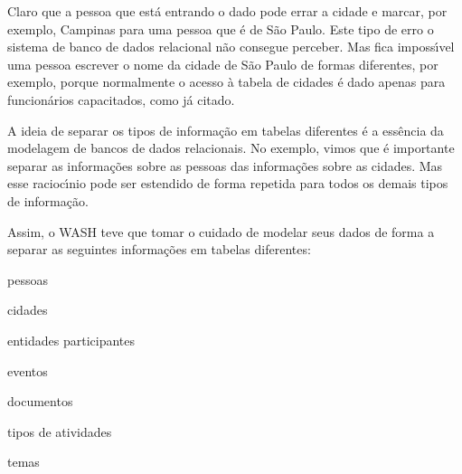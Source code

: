 \documentclass[
12pt,		%
openright,	%
twoside,  %
a4paper,			%
chapter=TITLE,		%
english,			%
french,				%
spanish,			%
brazil				%
]{USPSC-classe/USPSC}
\begin{document}
Claro que a pessoa que est\'a entrando o dado pode errar a cidade e marcar, por exemplo, Campinas para uma pessoa que \'e de S\~ao Paulo. Este tipo de erro o sistema de banco de dados relacional n\~ao consegue perceber. Mas fica imposs\'{\i}vel uma pessoa escrever o nome da cidade de S\~ao Paulo de formas diferentes, por exemplo, porque normalmente o acesso \`a tabela de cidades \'e dado apenas para funcion\'arios capacitados, como j\'a citado.

















A ideia de separar os tipos de informa\c{c}\~ao em tabelas diferentes \'e a ess\^encia da modelagem de bancos de dados relacionais. No exemplo, vimos que \'e importante separar as informa\c{c}\~oes sobre as pessoas das informa\c{c}\~oes sobre as cidades. Mas esse racioc\'{\i}nio pode ser estendido de forma repetida para todos os demais tipos de informa\c{c}\~ao.

















Assim, o WASH teve que tomar o cuidado de modelar seus dados de forma a separar as seguintes informa\c{c}\~oes em tabelas diferentes:


















\begin{alineas}
\item pessoas
\item cidades
\item entidades participantes
\item eventos
\item documentos
\item tipos de atividades
\item temas
\end{alineas}
\end{document}
